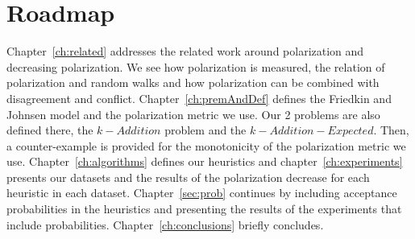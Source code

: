 \section{Roadmap}
\label{sec:roadmap}

Chapter~\ref{ch:related} addresses the related work around polarization and decreasing polarization. We see how polarization is measured, the relation of polarization and random walks and how polarization can be combined with disagreement and conflict. Chapter~\ref{ch:premAndDef} defines the Friedkin and Johnsen model and the polarization metric we use. Our 2 problems are also defined there, the $k-Addition$ problem and the $k-Addition-Expected$. Then, a counter-example is provided for the monotonicity of the polarization metric we use. Chapter~\ref{ch:algorithms}  defines our heuristics and chapter~\ref{ch:experiments} presents our datasets and the results of the polarization decrease for each heuristic in each dataset. Chapter~\ref{sec:prob} continues by including acceptance probabilities in the heuristics and presenting the results of the experiments that include probabilities.  Chapter~\ref{ch:conclusions} briefly concludes.




